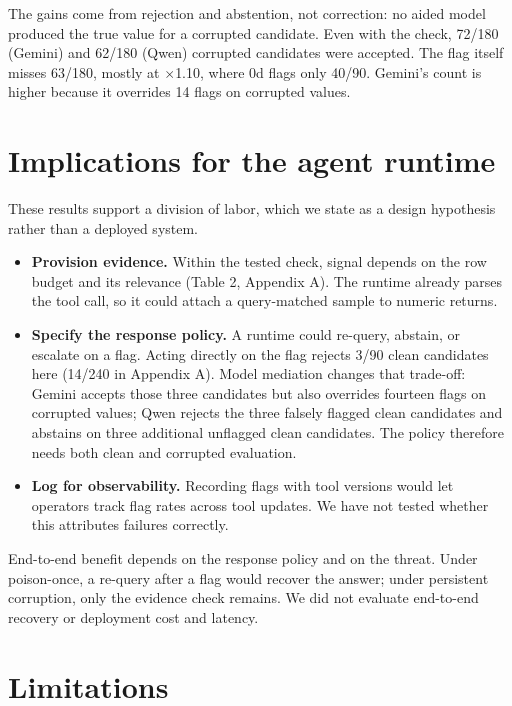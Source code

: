 \documentclass[letterpaper]{article}
\begin{document}
The gains come from rejection and abstention, not correction: no aided model produced the true value for a corrupted candidate. Even with the check, 72/180 (Gemini) and 62/180 (Qwen) corrupted candidates were accepted. The flag itself misses 63/180, mostly at \(\times\)1.10, where 0d flags only 40/90. Gemini's count is higher because it overrides 14 flags on corrupted values.


\section{Implications for the agent runtime}

These results support a division of labor, which we state as a design hypothesis rather than a deployed system.


\begin{itemize}

\item \textbf{Provision evidence.} Within the tested check, signal depends on the row budget and its relevance (Table 2, Appendix A). The runtime already parses the tool call, so it could attach a query-matched sample to numeric returns.

\item \textbf{Specify the response policy.} A runtime could re-query, abstain, or escalate on a flag. Acting directly on the flag rejects 3/90 clean candidates here (14/240 in Appendix A). Model mediation changes that trade-off: Gemini accepts those three candidates but also overrides fourteen flags on corrupted values; Qwen rejects the three falsely flagged clean candidates and abstains on three additional unflagged clean candidates. The policy therefore needs both clean and corrupted evaluation.

\item \textbf{Log for observability.} Recording flags with tool versions would let operators track flag rates across tool updates. We have not tested whether this attributes failures correctly.

\end{itemize}

End-to-end benefit depends on the response policy and on the threat. Under poison-once, a re-query after a flag would recover the answer; under persistent corruption, only the evidence check remains. We did not evaluate end-to-end recovery or deployment cost and latency.


\section{Limitations}
\end{document}
